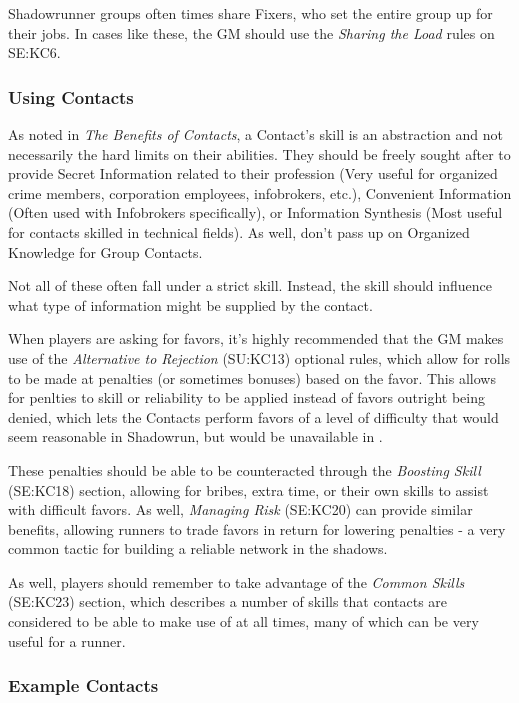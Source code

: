 \begin{multicols}{2}
	Shadowrunner groups often times share Fixers, who set the entire group up for their jobs. In cases like these, the GM should use the \textit{Sharing the Load} rules on SE:KC6.
	
	\subsubsection{Using Contacts}
	
	As noted in \textit{The Benefits of Contacts}, a Contact's skill is an abstraction and not necessarily the hard limits on their abilities. They should be freely sought after to provide Secret Information related to their profession (Very useful for organized crime members, corporation employees, infobrokers, etc.), Convenient Information (Often used with Infobrokers specifically), or Information Synthesis (Most useful for contacts skilled in technical fields). As well, don't pass up on Organized Knowledge for Group Contacts.
	
	Not all of these often fall under a strict skill. Instead, the skill should influence what type of information might be supplied by the contact.
	
	When players are asking for favors, it's highly recommended that the GM makes use of the \textit{Alternative to Rejection} (SU:KC13) optional rules, which allow for rolls to be made at penalties (or sometimes bonuses) based on the favor. This allows for penlties to skill or reliability to be applied instead of favors outright being denied, which lets the Contacts perform favors of a level of difficulty that would seem reasonable in Shadowrun, but would be unavailable in \GURPS.
	
	These penalties should be able to be counteracted through the \textit{Boosting Skill} (SE:KC18) section, allowing for bribes, extra time, or their own skills to assist with difficult favors. As well, \textit{Managing Risk} (SE:KC20) can provide similar benefits, allowing runners to trade favors in return for lowering penalties - a very common tactic for building a reliable network in the shadows.
	
	As well, players should remember to take advantage of the \textit{Common Skills} (SE:KC23) section, which describes a number of skills that contacts are considered to be able to make use of at all times, many of which can be very useful for a runner.
	
	\subsubsection{Example Contacts}
	

\end{multicols}
